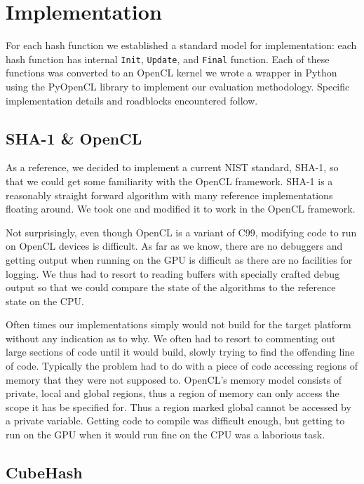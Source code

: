 \section*{Implementation}

For each hash function we established a standard model for implementation: each hash function has internal {\tt Init}, {\tt Update}, and {\tt Final} function.
Each of these functions was converted to an OpenCL kernel we wrote a wrapper in Python using the PyOpenCL library to implement our evaluation methodology.
Specific implementation details and roadblocks encountered follow.

\subsection*{SHA-1 \& OpenCL}

As a reference, we decided to implement a current NIST standard, SHA-1, so that we could get some familiarity with the OpenCL framework.
SHA-1 is a reasonably straight forward algorithm with many reference implementations floating around.
We took one and modified it to work in the OpenCL framework.

Not surprisingly, even though OpenCL is a variant of C99, modifying code to run on OpenCL devices is difficult.
As far as we know, there are no debuggers and getting output when running on the GPU is difficult as there are no facilities for logging.
We thus had to resort to reading buffers with specially crafted debug output so that we could compare the state of the algorithms to the reference state on the CPU.

Often times our implementations simply would not build for the target platform without any indication as to why.
We often had to resort to commenting out large sections of code until it would build, slowly trying to find the offending line of code.
Typically the problem had to do with a piece of code accessing regions of memory that they were not supposed to.
OpenCL's memory model consists of private, local and global regions, thus a region of memory can only access the scope it has be specified for.
Thus a region marked global cannot be accessed by a private variable.
Getting code to compile was difficult enough, but getting to run on the GPU when it would run fine on the CPU was a laborious task.

\subsection*{CubeHash}


